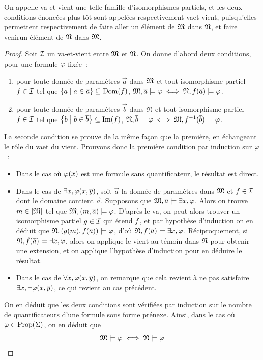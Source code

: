 \begin{remark}
  On appelle va-et-vient une telle famille d'isomorphismes partiels, et les
  deux conditions énoncées plus tôt sont appelées respectivement \og va\fg et
  \og vient\fg, puisqu'elles permettent respectivement de \og faire aller\fg
  un élément de $\mathfrak{M}$ dans $\mathfrak{N}$, et \og faire venir\fg un élément de
  $\mathfrak{N}$ dans $\mathfrak{M}$.
\end{remark}

\begin{proof}
  Soit $\mathcal{I}$ un va-et-vient entre $\mathfrak{M}$ et $\mathfrak{N}$. On donne d'abord
  deux conditions, pour une formule $\varphi$ fixée~:
  \begin{enumerate}[label=(\roman*)]
  \item pour toute donnée de paramètres $\vec a$ dans $\mathfrak{M}$ et tout
    isomorphisme partiel $f\in\mathcal{I}$ tel que
    $\left\{ a \;\middle\vert\; a\in\overline{a} \right\}\subseteq\operatorname{Dom}(f)$,
    $\mathfrak{M},\overline{a}\models\varphi \iff \mathfrak{N},f(\overline{a})\models\varphi$.
  \item pour toute donnée de paramètres $\vec b$ dans $\mathfrak{N}$ et tout
    isomorphisme partiel $f\in\mathcal{I}$ tel que
    $\left\{ b \;\middle\vert\; b\in\overline{b} \right\}\subseteq\operatorname{Im}(f)$,
    $\mathfrak{N},\overline{b}\models\varphi \iff \mathfrak{M},f^{-1}(\overline{b})\models\varphi$.
  \end{enumerate}
  La seconde condition se prouve de la même façon que la première, en
  échangeant le rôle du \og va\fg et du \og vient\fg. Prouvons donc la première
  condition par induction sur $\varphi$~:
  \begin{itemize}
  \item Dans le cas où $\varphi(\overline{x})$ est une formule sans quantificateur,
    le résultat est direct.
  \item Dans le cas de $\exists x, \varphi(x,\overline{y})$, soit $\vec a$ la donnée
    de paramètres dans $\mathfrak{M}$ et $f\in\mathcal{I}$ dont le domaine
    contient $\vec a$. Supposons que $\mathfrak{M},\overline{a} \models\exists x,\varphi$.
    Alors on trouve $m \in\left\vert \mathfrak{M}\right\vert$ tel que $\mathfrak{M},(m,\overline{a})\models\varphi$.
    D'après le \og va\fg, on peut alors trouver un isomorphisme partiel
    $g\in\mathcal{I}$ qui étend $f$, et par hypothèse d'induction
    on en déduit que $\mathfrak{N},(g(m),f(\overline{a}))\models\varphi$,
    d'où $\mathfrak{N},f(\overline{a})\models\exists x,\varphi$. Réciproquement,
    si $\mathfrak{N},f(\overline{a})\models\exists x,\varphi$, alors on applique le \og vient\fg
    au témoin dans $\mathfrak{N}$ pour obtenir une extension, et on applique
    l'hypothèse d'induction pour en déduire le résultat.
  \item Dans le cas de $\forall x, \varphi(x,\overline{y})$, on remarque que cela
    revient à ne pas satisfaire $\exists x,\lnot\varphi(x,\overline{y})$, ce qui
    revient au cas précédent.
  \end{itemize}
  On en déduit que les deux conditions sont vérifiées par induction sur le
  nombre de quantificateurs d'une formule sous forme prénexe.
  Ainsi, dans le cas où $\varphi\in\operatorname{Prop}(\Sigma)$, on en déduit que
  \[\mathfrak{M}\models\varphi\iff\mathfrak{N}\models\varphi\qedhere\]
\end{proof}

